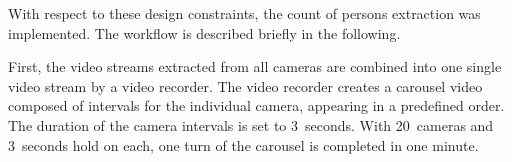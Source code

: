 With respect to these design constraints, the count of persons extraction was implemented. The workflow is described briefly in the following.

First, the video streams extracted from all cameras are combined into one single video stream by a video recorder. 
The video recorder creates a carousel video composed of intervals for the individual camera, appearing in a predefined order. 
The duration of the camera intervals is set to 3~seconds. With 20~cameras and 3~seconds hold on each, one turn of the carousel is completed in one minute.

